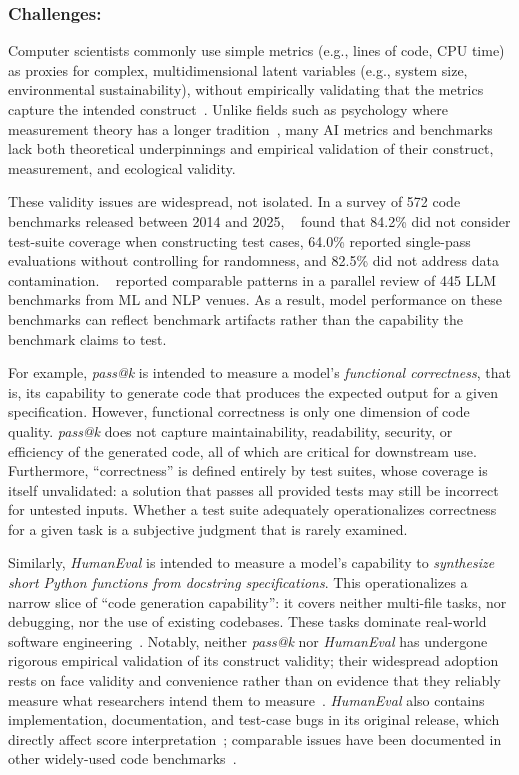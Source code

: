 \documentclass[smallextended]{svjour3}
\newcommand{\guidelinesubsubsection}[1]{\subsubsection{\bfseries #1:}}
\newcommand{\guidelinesubsubsection}[1]{\subsubsection{#1}}
\begin{document}
\guidelinesubsubsection{Challenges}

Computer scientists commonly use simple metrics (e.g., lines of code, CPU time) as proxies for complex, multidimensional latent variables (e.g., system size, environmental sustainability), without empirically validating that the metrics capture the intended construct~\cite{DBLP:conf/ease/RalphT18}. Unlike fields such as psychology where measurement theory has a longer tradition~\cite{borsboom2005measuring}, many AI metrics and benchmarks lack both theoretical underpinnings and empirical validation of their construct, measurement, and ecological validity.

These validity issues are widespread, not isolated. In a survey of 572 code benchmarks released between 2014 and 2025, \citeauthor{cao2025should}~\cite{cao2025should} found that 84.2\% did not consider test-suite coverage when constructing test cases, 64.0\% reported single-pass evaluations without controlling for randomness, and 82.5\% did not address data contamination. \citeauthor{bean2025measuring}~\cite{bean2025measuring} reported comparable patterns in a parallel review of 445 LLM benchmarks from ML and NLP venues. As a result, model performance on these benchmarks can reflect benchmark artifacts rather than the capability the benchmark claims to test.

For example, \emph{pass@k} is intended to measure a model's \textit{functional correctness}, that is, its capability to generate code that produces the expected output for a given specification. However, functional correctness is only one dimension of code quality. \emph{pass@k} does not capture maintainability, readability, security, or efficiency of the generated code, all of which are critical for downstream use. Furthermore, ``correctness'' is defined entirely by test suites, whose coverage is itself unvalidated: a solution that passes all provided tests may still be incorrect for untested inputs. Whether a test suite adequately operationalizes correctness for a given task is a subjective judgment that is rarely examined.

Similarly, \emph{HumanEval} is intended to measure a model's capability to \textit{synthesize short Python functions from docstring specifications}. This operationalizes a narrow slice of ``code generation capability'': it covers neither multi-file tasks, nor debugging, nor the use of existing codebases. These tasks dominate real-world software engineering~\cite{Chandra2025benchmarks, yang2025code}. Notably, neither \emph{pass@k} nor \emph{HumanEval} has undergone rigorous empirical validation of its construct validity; their widespread adoption rests on face validity and convenience rather than on evidence that they reliably measure what researchers intend them to measure~\cite{cao2025should}. \emph{HumanEval} also contains implementation, documentation, and test-case bugs in its original release, which directly affect score interpretation~\cite{DBLP:conf/nips/LiuXW023}; comparable issues have been documented in other widely-used code benchmarks~\cite{cao2025should}.
\end{document}

